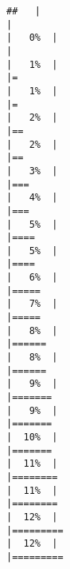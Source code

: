 \documentclass[
]{article}
\begin{document}
\begin{verbatim}
##   |                                                                              |                                                                      |   0%  |                                                                              |                                                                      |   1%  |                                                                              |=                                                                     |   1%  |                                                                              |=                                                                     |   2%  |                                                                              |==                                                                    |   2%  |                                                                              |==                                                                    |   3%  |                                                                              |===                                                                   |   4%  |                                                                              |===                                                                   |   5%  |                                                                              |====                                                                  |   5%  |                                                                              |====                                                                  |   6%  |                                                                              |=====                                                                 |   7%  |                                                                              |=====                                                                 |   8%  |                                                                              |======                                                                |   8%  |                                                                              |======                                                                |   9%  |                                                                              |=======                                                               |   9%  |                                                                              |=======                                                               |  10%  |                                                                              |=======                                                               |  11%  |                                                                              |========                                                              |  11%  |                                                                              |========                                                              |  12%  |                                                                              |=========                                                             |  12%  |                                                                              |========= 
\end{verbatim}
\end{document}

